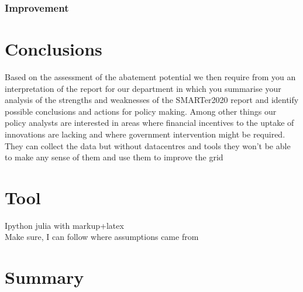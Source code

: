 \documentclass[11pt, twocolumn]{article}
\begin{document}
\subsubsection{Improvement}

\section{Conclusions}
Based on the assessment of the abatement potential we then require from you an interpretation of the report for our department in which you summarise your analysis of the strengths and weaknesses of the SMARTer2020 report and identify possible conclusions and actions for policy making. Among other things our policy analysts are interested in areas where financial incentives to the uptake of innovations are lacking and where government intervention might be required.\\

They can collect the data but without datacentres and tools they won't be able to make any sense of them and use them to improve the grid

\section{Tool}
Ipython julia with markup+latex\\
Make sure, I can follow where assumptions came from

\section{Summary}
\end{document}
